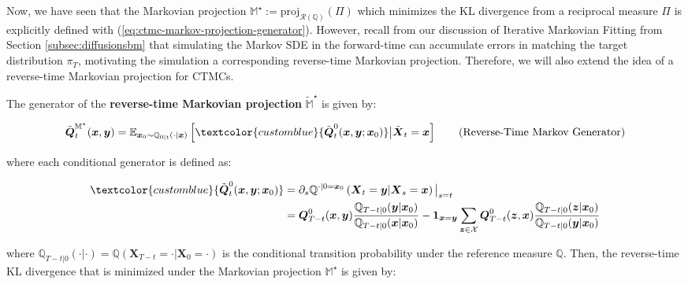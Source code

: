 \documentclass{article}
\newcommand{\bluetext}[1]{\textcolor{customblue}{#1}}
\begin{document}
Now, we have seen that the Markovian projection $\mathbb{M}^\star:=\text{proj}_{\mathcal{R}(\mathbb{Q})}(\Pi)$ which minimizes the KL divergence from a reciprocal measure $\Pi$ is explicitly defined with (\ref{eq:ctmc-markov-projection-generator}). However, recall from our discussion of Iterative Markovian Fitting from Section \ref{subsec:diffusionsbm} that simulating the Markov SDE in the forward-time can accumulate errors in matching the target distribution $\pi_T$, motivating the simulation a corresponding reverse-time Markovian projection. Therefore, we will also extend the idea of a reverse-time Markovian projection for CTMCs.

\begin{definition}\label{def:reverse-time-markov-proj}
    The generator of the \textbf{reverse-time Markovian projection} $\tilde{\mathbb{M}}^\star$ is given by:
    \begin{small}
    \begin{align}
        \tilde{\boldsymbol{Q}}_t^{\mathbb{M}^\star}(\boldsymbol{x},\boldsymbol{y})=\mathbb{E}_{\boldsymbol{x}_0\sim \mathbb{Q}_{0|t}(\cdot|\boldsymbol{x})}\left[\bluetext{\tilde{\boldsymbol{Q}}_t^0(\boldsymbol{x},\boldsymbol{y};\boldsymbol{x}_0)}\big|\tilde{\boldsymbol{X}}_t=\boldsymbol{x}\right]\tag{Reverse-Time Markov Generator}\label{eq:reverse-time-generator}
    \end{align}
    \end{small}
    where each conditional generator is defined as:
    \begin{small}
    \begin{align}
        \bluetext{\tilde{\boldsymbol{Q}}_t^0(\boldsymbol{x},\boldsymbol{y};\boldsymbol{x}_0)}&=\partial_s\mathbb{Q}^{\cdot |0=\boldsymbol{x}_0}\left(\boldsymbol{X}_t=\boldsymbol{y}|\boldsymbol{X}_s=\boldsymbol{x}\right)\big|_{s=t}\nonumber\\
        &=\boldsymbol{Q}^0_{T-t}(\boldsymbol{x},\boldsymbol{y})\frac{\mathbb{Q}_{T-t|0}(\boldsymbol{y}|\boldsymbol{x}_0)}{\mathbb{Q}_{T-t|0}(\boldsymbol{x}|\boldsymbol{x}_0)}-\boldsymbol{1}_{\boldsymbol{x}=\boldsymbol{y}}\sum_{\boldsymbol{z}\in \mathcal{X}}\boldsymbol{Q}^0_{T-t}(\boldsymbol{z},\boldsymbol{x})\frac{\mathbb{Q}_{T-t|0}(\boldsymbol{z}|\boldsymbol{x}_0)}{\mathbb{Q}_{T-t|0}(\boldsymbol{y}|\boldsymbol{x}_0)}
    \end{align}
    \end{small}
    where $\mathbb{Q}_{T-t|0}(\cdot|\cdot)=\mathbb{Q}(\boldsymbol{X}_{T-t}=\cdot|\boldsymbol{X}_0=\cdot)$ is the conditional transition probability under the reference measure $\mathbb{Q}$. Then, the reverse-time KL divergence that is minimized under the Markovian projection $\mathbb{M}^\star$ is given by:

\end{definition}
\end{document}
